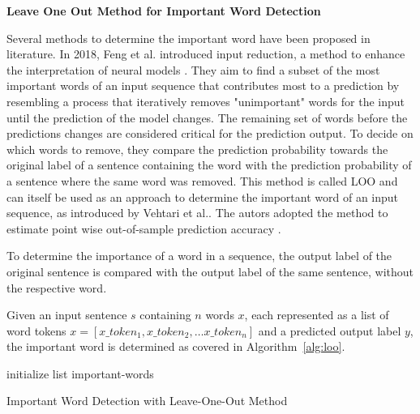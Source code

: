         \textbf{Leave One Out Method for Important Word Detection}
        
            Several methods to determine the important word have been proposed in literature.
            In 2018, Feng et al. introduced input reduction, a method to enhance the interpretation of neural models \cite{feng2018pathologies}. They aim to find a subset of the most important words of an input sequence that contributes most to a prediction by resembling a process that iteratively removes "unimportant" words for the input until the prediction of the model changes. The remaining set of words before the predictions changes are considered critical for the prediction output. To decide on which words to remove, they compare the prediction probability towards the original label of a sentence containing the word with the prediction probability of a sentence where the same word was removed. This method is called LOO and can itself be used as an approach to determine the important word of an input sequence, as introduced by Vehtari et al.. The autors adopted the method to estimate point wise out-of-sample prediction accuracy \cite{vehtari2017practical}. 

            To determine the importance of a word in a sequence, the output label of the original sentence is compared with the output label of the same sentence, without the respective word. 
             
            Given an input sentence $s$ containing $n$ words $x$, each represented as a list of word tokens 
            ${x = [x\_token_1, x\_token_2, \dots x\_token_n]}$ and a predicted output label $y$, the important word is determined as covered in Algorithm~\ref{alg:loo}. 

            \IncMargin{1em}
            \begin{algorithm}[H]
            \SetAlgoLined
            \DontPrintSemicolon
            \Indm 
            \Indp
            initialize list important-words\;
            \caption{Important Word Detection with Leave-One-Out Method}
            \label{alg:loo}
            \end{algorithm}
            \DecMargin{1em}

